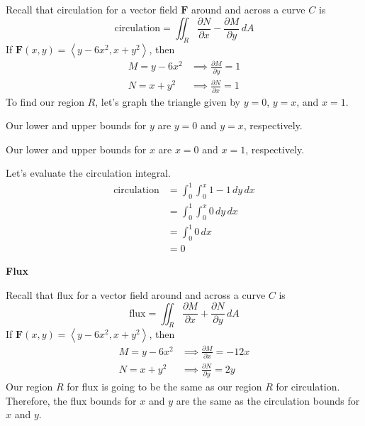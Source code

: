 \documentclass{article}
\newcommand{\lra}[1]{\left\langle #1 \right\rangle}
\newcommand{\F}[0]{\mathbf{F}}
\begin{document}
Recall that circulation for a vector field $\F$ around and across a curve $C$ is
\begin{equation*}
    \text{circulation}= \iint_R \frac{\partial N}{\partial x} - \frac{\partial M}{\partial y}\,dA
\end{equation*}
If $\F(x,y)=\lra{y-6x^2,x+y^2}$, then
\begin{align*}
    M=y-6x^2&\implies \frac{\partial M}{\partial y}= 1\\
    N=x+y^2&\implies \frac{\partial N}{\partial x}= 1
\end{align*}
To find our region $R$, let's graph the triangle given by $y=0$, $y=x$, and $x=1$.
\begin{center}
\end{center}
Our lower and upper bounds for $y$ are $y=0$ and $y=x$, respectively.

Our lower and upper bounds for $x$ are $x=0$ and $x=1$, respectively.

Let's evaluate the circulation integral.
\begin{align*}
    \text{circulation}&=\int_0^1\int_0^x 1 - 1 \,dy\,dx\\
    &=\int_0^1\int_0^x 0\,dy\,dx\\
    &=\int_0^1 0\,dx\tag{integral of $0$ is $0$}\\
    &=0\tag{integral of $0$ is $0$}
\end{align*}

{}\textbf{Flux}

Recall that flux for a vector field around and across a curve $C$ is
\begin{equation*}
   \text{flux} = \iint_R \frac{\partial M}{\partial x} + \frac{\partial N}{\partial y}\,dA
\end{equation*}
If $\F(x,y)=\lra{y-6x^2,x+y^2}$, then
\begin{align*}
     M=y-6x^2&\implies \frac{\partial M}{\partial x}=-12x\\
    N=x+y^2&\implies \frac{\partial N}{\partial y}= 2y
\end{align*}
Our region $R$ for flux is going to be the same as our region $R$ for circulation. Therefore, the flux bounds for
$x$ and $y$ are the same as the circulation bounds for $x$ and $y$.
\end{document}
